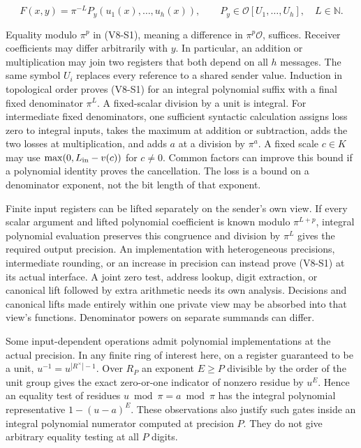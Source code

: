 \documentclass[11pt,a4paper]{article}
\begin{document}
\[
 F(x,y)=\pi^{-L}P_y(u_1(x),\ldots,u_h(x)),\qquad
 P_y\in\mathcal O[U_1,\ldots,U_h],\quad L\in\mathbb N.                 \tag{V8-S1}
\]

Equality modulo \(\pi^p\) in (V8-S1), meaning a difference in
\(\pi^p\mathcal O\), suffices. Receiver coefficients may differ
arbitrarily with \(y\). In particular, an addition or multiplication may
join two registers that both depend on all \(h\) messages. The same
symbol \(U_i\) replaces every reference to a shared sender value.
Induction in topological order proves (V8-S1) for an integral polynomial
suffix with a final fixed denominator \(\pi^L\). A fixed-scalar division
by a unit is integral. For intermediate fixed denominators, one
sufficient syntactic calculation assigns loss zero to integral inputs,
takes the maximum at addition or subtraction, adds the two losses at
multiplication, and adds \(a\) at a division by \(\pi^a\). A fixed scale
\(c\in K\) may use \(\max(0,L_{\rm in}-v(c))\) for \(c\ne0\). Common
factors can improve this bound if a polynomial identity proves the
cancellation. The loss is a bound on a denominator exponent, not the bit
length of that exponent.

Finite input registers can be lifted separately on the sender's own
view. If every scalar argument and lifted polynomial coefficient is
known modulo \(\pi^{L+p}\), integral polynomial evaluation preserves
this congruence and division by \(\pi^L\) gives the required output
precision. An implementation with heterogeneous precisions, intermediate
rounding, or an increase in precision can instead prove (V8-S1) at its
actual interface. A joint zero test, address lookup, digit extraction,
or canonical lift followed by extra arithmetic needs its own analysis.
Decisions and canonical lifts made entirely within one private view may
be absorbed into that view's functions. Denominator powers on separate
summands can differ.

Some input-dependent operations admit polynomial implementations at the
actual precision. In any finite ring of interest here, on a register
guaranteed to be a unit, \(u^{-1}=u^{|R^\times|-1}\). Over \(R_P\) an
exponent \(E\ge P\) divisible by the order of the unit group gives the
exact zero-or-one indicator of nonzero residue by \(u^E\). Hence an
equality test of residues \(u\bmod\pi=a\bmod\pi\) has the integral
polynomial representative \(1-(u-a)^E\). These observations also justify
such gates inside an integral polynomial numerator computed at precision
\(P\). They do not give arbitrary equality testing at all \(P\) digits.
\end{document}
